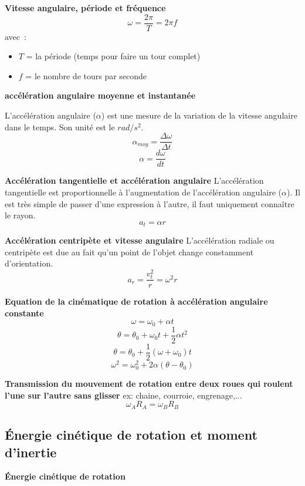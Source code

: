 \documentclass{article}
\begin{document}
\noindent
\textbf{Vitesse angulaire, période et fréquence}
\[\omega = \frac{2\pi}{T} = 2\pi f\]
avec :
\begin{itemize}
    \item $T$ = la période (temps pour faire un tour complet)
    \item $f$ = le nombre de tours par seconde
\end{itemize}
\newline

\noindent
\textbf{accélération angulaire moyenne et instantanée}
\newline

L'accélération angulaire ($\alpha$) est une mesure de la variation de la vitesse angulaire dans le temps. Son unité est le $rad/s^2$.
\[\alpha_{moy} = \frac{\Delta\omega}{\Delta t}\]
\[\alpha = \frac{d\omega}{dt}\]
\newline

\noindent
\textbf{Accélération tangentielle et accélération angulaire}
\newline
L'accélération tangentielle est proportionnelle à l'augmentation de l'accélération angulaire ($\alpha$). Il est très simple de passer d'une expression à l'autre, il faut uniquement connaître le rayon.
\[a_t = \alpha r\]
\newline

\noindent
\textbf{Accélération centripète et vitesse angulaire}
\newline
L'accélération radiale ou centripète est due au fait qu'un point de l'objet change constamment d'orientation.
\[a_r = \frac{v_t^2}{r} = \omega^2r\]
\newline

\noindent
\textbf{Equation de la cinématique de rotation à accélération angulaire constante}
\[\omega = \omega_0 + \alpha t\]
\[\theta = \theta_0 + \omega_0t +\frac{1}{2}\alpha t^2\]
\[\theta = \theta_0 +\frac{1}{2}(\omega+\omega_0)t\]
\[\omega^2 = \omega_0^2 + 2\alpha(\theta - \theta_0)\]

\newline

\noindent
\textbf{Transmission du mouvement de rotation entre deux roues qui roulent l'une sur l'autre sans glisser}
\newline
ex: chaine, courroie, engrenage,...
\[\omega_AR_A = \omega_BR_B\]

\subsection{Énergie cinétique de rotation et moment d'inertie}
\textbf{Énergie cinétique de rotation}
\newline
\end{document}
